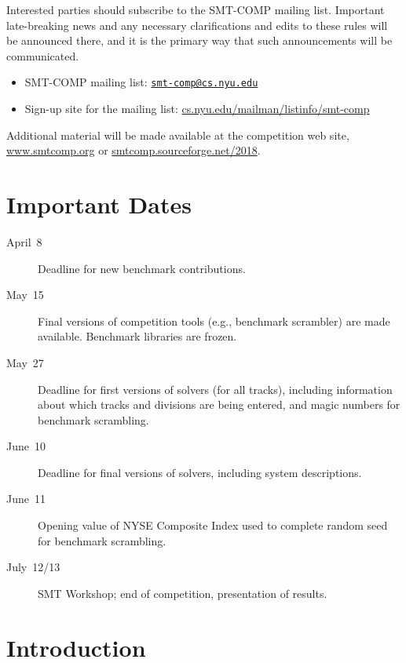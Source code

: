 \documentclass[12pt]{article}
\begin{document}
Interested parties should subscribe to the SMT-COMP mailing list.
Important late-breaking news and any necessary clarifications and
edits to these rules will be announced there, and it is the primary
way that such announcements will be communicated.

\begin{itemize}
\item SMT-COMP mailing list:
  \href{mailto:smt-comp@cs.nyu.edu}{\texttt{smt-comp@cs.nyu.edu}}
\item Sign-up site for the mailing list:
  \url{cs.nyu.edu/mailman/listinfo/smt-comp}
\end{itemize}

\noindent Additional material will be made available at the
competition web site, \url{www.smtcomp.org} or
\url{smtcomp.sourceforge.net/2018}.


\newpage

\section{Important Dates}
\label{sec:important}

\begin{description}
\item[April~8] Deadline for new benchmark contributions.
\item[May~15] Final versions of competition tools (e.g., benchmark
  scrambler) are made available.  Benchmark libraries are frozen.
\item[May~27] Deadline for first versions of solvers (for all tracks),
  including information about which tracks and divisions are being
  entered, and magic numbers for benchmark scrambling.
\item[June~10] Deadline for final versions of solvers, including
  system descriptions.
\item[June~11] Opening value of NYSE Composite Index used to complete
  random seed for benchmark scrambling.
\item[July~12/13] SMT Workshop; end of competition, presentation of
  results.
\end{description}


\section{Introduction}
\end{document}
